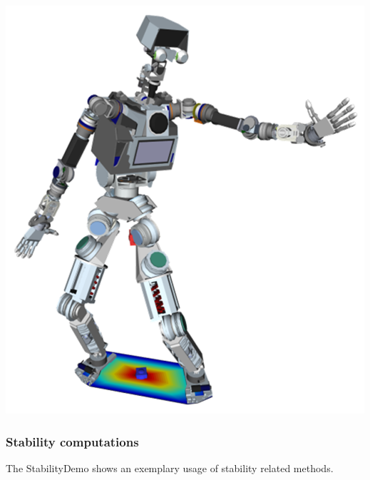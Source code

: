 \includegraphics[width=\textwidth]{HierarchicalIK}
\subsubsection{Stability computations}
The StabilityDemo shows an exemplary usage of stability related methods.\par

